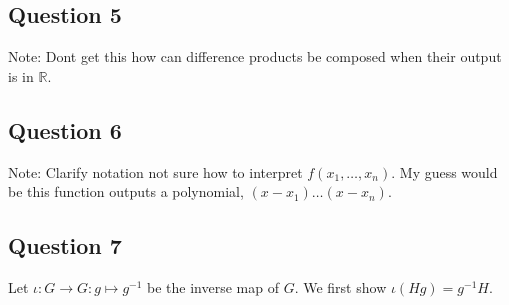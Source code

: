 \subsection{Question 5}
Note: Dont get this how can difference products be composed when their output is in \( \mathbb{R} \).

\subsection{Question 6}
Note: Clarify notation not sure how to interpret \( f(x_{1},\ldots,x_{n}) \). My guess would be this
function outputs a polynomial, \( (x-x_1)\ldots(x-x_n) \).

\subsection{Question 7}
Let
\( \iota: G \to G: g \mapsto g^{-1}   \) be the inverse map of \( G \). We first show 
\( \iota \left( Hg \right) = g^{-1}H \).








